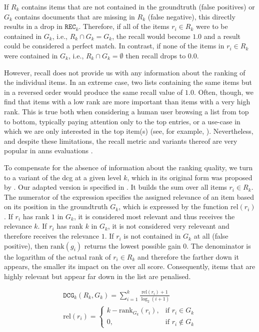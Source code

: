 If $R_k$ contains items that are not contained in the groundtruth (false positives) or $G_k$ contains documents that are missing in $R_k$ (false negative), this directly results in a drop in $\texttt{REC}_k$. Therefore, if all of the items $r_i \in R_k$ were to be contained in $G_k$, i.e., $R_k \cap G_k = G_k$, the recall would become $1.0$ and a result could be considered a perfect match. In contrast, if none of the items in $r_i \in R_k$ were contained in $G_k$, i.e., $R_k \cap G_k = \emptyset$ then recall drops to $0.0$. 

However, recall does not provide us with any information about the ranking of the individual items. In an extreme case, two lists containing the same items but in a reversed order would produce the same recall value of $1.0$. Often, though, we find that items with a low rank are more important than items with a very high rank. This is true both when considering a human user browsing a list from top to bottom, typically paying attention only to the top entries, or a use-case in which we are only interested in the top item(s) (see, for example, ). Nevertheless, and despite these limitations, the recall metric and variants thereof are very popular in \acrshort{anns} evaluations \cite{Aumueller:2017ANN,Simhadri:2022Results}. 

To compensate for the absence of information about the ranking quality, we turn to a variant of the \acrshort{dcg} at a given level $k$, which in its original form was proposed by \cite{Jarvelin:2002Cumulated}. Our adapted version is specified in . It builds the sum over all items $r_i \in R_k$. The numerator of the expression specifies the assigned relevance of an item based on its position in the groundtruth $G_k$, which is expressed by the function $\text{rel} (r_i)$. If $r_i$ has rank $1$ in $G_k$, it is considered most relevant and thus receives the relevance $k$. If $r_i$ has rank $k$ in $G_k$, it is not considered very releveant and therefore receives the relevance $1$. If $r_i$ is not contained in $G_k$ at all (false positive), then $\text{rank} (g_i)$ returns the lowest possible gain $0$. The denominator is the logarithm of the actual rank of $r_i \in R_k$ and therefore the farther down it appears, the smaller its impact on the over all score. Consequently, items that are highly relevant but appear far down in the list are penalised.

\begin{eqnarray}
\label{equation:dcg}
\mathtt{DCG}_k (R_k, G_k)= \sum_{i = 1}^{k} \frac{\text{rel}(r_i) + 1}{\log_2(i + 1)} \\
\text{rel} (r_i) = 
    \begin{cases}
        k - \text{rank}_{G_k}(r_i), &  \text{if } r_i \in G_k \\
        0,                          &  \text{if } r_i \notin G_k
    \end{cases}
\end{eqnarray}


